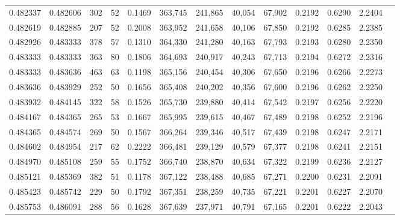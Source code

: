 \begin{tabular}{rrrrrrrrrrrrr}
0.482337 & 0.482606 &    302 &    52 &                                     0.1469 & 363,745 & 241,865 &  40,054 &  67,902 & 0.2192 & 0.6290 & 2.2404 \\
0.482619 & 0.482885 &    207 &    52 &                                     0.2008 & 363,952 & 241,658 &  40,106 &  67,850 & 0.2192 & 0.6285 & 2.2385 \\
0.482926 & 0.483333 &    378 &    57 &                                     0.1310 & 364,330 & 241,280 &  40,163 &  67,793 & 0.2193 & 0.6280 & 2.2350 \\
0.483333 & 0.483333 &    363 &    80 &                                     0.1806 & 364,693 & 240,917 &  40,243 &  67,713 & 0.2194 & 0.6272 & 2.2316 \\
0.483333 & 0.483636 &    463 &    63 &                                     0.1198 & 365,156 & 240,454 &  40,306 &  67,650 & 0.2196 & 0.6266 & 2.2273 \\
0.483636 & 0.483929 &    252 &    50 &                                     0.1656 & 365,408 & 240,202 &  40,356 &  67,600 & 0.2196 & 0.6262 & 2.2250 \\
0.483932 & 0.484145 &    322 &    58 &                                     0.1526 & 365,730 & 239,880 &  40,414 &  67,542 & 0.2197 & 0.6256 & 2.2220 \\
0.484167 & 0.484365 &    265 &    53 &                                     0.1667 & 365,995 & 239,615 &  40,467 &  67,489 & 0.2198 & 0.6252 & 2.2196 \\
0.484365 & 0.484574 &    269 &    50 &                                     0.1567 & 366,264 & 239,346 &  40,517 &  67,439 & 0.2198 & 0.6247 & 2.2171 \\
0.484602 & 0.484954 &    217 &    62 &                                     0.2222 & 366,481 & 239,129 &  40,579 &  67,377 & 0.2198 & 0.6241 & 2.2151 \\
0.484970 & 0.485108 &    259 &    55 &                                     0.1752 & 366,740 & 238,870 &  40,634 &  67,322 & 0.2199 & 0.6236 & 2.2127 \\
0.485121 & 0.485369 &    382 &    51 &                                     0.1178 & 367,122 & 238,488 &  40,685 &  67,271 & 0.2200 & 0.6231 & 2.2091 \\
0.485423 & 0.485742 &    229 &    50 &                                     0.1792 & 367,351 & 238,259 &  40,735 &  67,221 & 0.2201 & 0.6227 & 2.2070 \\
0.485753 & 0.486091 &    288 &    56 &                                     0.1628 & 367,639 & 237,971 &  40,791 &  67,165 & 0.2201 & 0.6222 & 2.2043 \\

\end{tabular}
